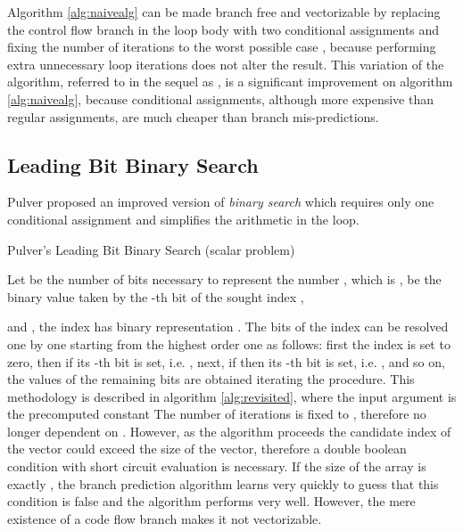 \documentclass[preprint,1p,times]{elsarticle}
\begin{document}
Algorithm \ref{alg:naivealg} can be made branch free and vectorizable by replacing the control flow branch in the loop body with two conditional assignments and fixing the number of iterations to the worst possible case , because performing extra unnecessary loop iterations does not alter the result. 
This variation of the algorithm, referred to in the sequel as \textit{\ClassicModName}, is a significant improvement on algorithm \ref{alg:naivealg}, because conditional assignments, although more expensive than regular assignments, are much cheaper than branch mis-predictions.

\subsection{Leading Bit Binary Search}
\label{sec:optimbinary}

Pulver \cite{Pulver2011} proposed an improved version of \textit{binary search} which requires only one conditional assignment and simplifies the arithmetic in the loop.

\begin{algorithm}[ht]
	\caption{Pulver's Leading Bit Binary Search (scalar problem)}
	\label{alg:revisited}
	\begin{algorithmic}
		 \Comment{}
		\State 
		\State 
		\Repeat
		\State  {}
		\If {} 
		\State 
		\EndIf
		\State  {}
		\Until{  }
		\EndFunction
	\end{algorithmic}
\end{algorithm}

Let  be the number of bits necessary to represent the number , which is ,
     be the binary value taken by the -th bit of the sought index ,
    
    and ,
the index  has binary representation .
The bits of the index can be resolved one by one starting from the highest order one as follows:
first the index is set to zero, then if  its -th bit is set, i.e. ,
next, if  then its -th bit is set, i.e. , 
and so on, the values of the remaining bits are obtained iterating the procedure.
This methodology is described in algorithm \ref{alg:revisited}, where the input argument  is the precomputed constant 
The number of iterations is fixed to , therefore no longer dependent on . However,
as the algorithm proceeds the candidate index of the vector  could exceed the
size of the vector, therefore a double boolean condition with short circuit evaluation is necessary. If the size of the array  is exactly , the branch prediction algorithm learns very quickly to guess that this condition is false and the algorithm performs very well. However, the mere existence of a code flow branch makes it not vectorizable.
\end{document}
